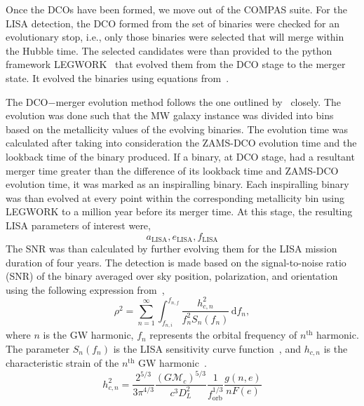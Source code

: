 \documentclass[journal, twocolumn]{IEEEtran}
\newcommand{\semaxis}[1]{a_{\text{#1}}}
\newcommand{\ecc}[1]{e_\text{#1}}
\begin{document}
    Once the DCOs have been formed, we move out of the COMPAS suite.
    For the LISA detection, the DCO formed from the set of binaries were checked for an evolutionary stop, i.e., only those binaries were selected that will merge within the Hubble time.
    The selected candidates were than provided to the python framework LEGWORK~\cite{wagg2021legwork} that evolved them from the DCO stage to the merger state.
    It evolved the binaries using equations from~\cite{Peters1963, Peters1964}.

    The DCO$-$merger evolution method follows the one outlined by~\cite{wagg2021gravitational} closely.
    The evolution was done such that the MW galaxy instance was divided into bins based on the metallicity values of the evolving binaries.
    The evolution time was calculated after taking into consideration the ZAMS-DCO evolution time and the lookback time of the binary produced.
    If a binary, at DCO stage, had a resultant merger time greater than the difference of its lookback time and ZAMS-DCO evolution time, it was marked as an inspiralling binary.
    Each inspiralling binary was than evolved at every point within the corresponding metallicity bin using LEGWORK to a million year before its merger time.
    At this stage, the resulting LISA parameters of interest were,
    \begin{equation}%
        \semaxis{LISA}, \ecc{LISA}, f_{\text{LISA}}
        \label{eq:lisa_parameter_names}
    \end{equation}%
    The SNR was than calculated by further evolving them for the LISA mission duration of four years. The detection is made based on the signal-to-noise ratio (SNR) of the binary averaged over sky position, polarization, and orientation using the following expression from~\cite{Finn2000},
    \begin{equation}
    \rho^2 = \sum_{n=1}^{\infty}\int_{f_{n, i}}^{f_{n, f}}\frac{h_{c, n}^2}{f_n^2 S_n(f_n)}\,\text{d}f_n,
    \label{eq:snr_equation}
    \end{equation}
    where $n$ is the GW harmonic, $f_n$ represents the orbital frequency of $n^\text{th}$ harmonic.
    The parameter $S_n(f_n)$ is the LISA sensitivity curve function~\cite{Robson2019}, and $h_{c, n}$ is the characteristic strain of the $n^\text{th}$ GW harmonic~\cite{Barack2004}.
    \begin{equation}
    h_{c,n}^2 = \frac{2^{5/3}}{3\pi^{4/3}}\frac{(G\mathcal{M}_c)^{5/3}}{c^3 D_L^2}\frac{1}{f_\text{orb}^{1/3}}\frac{g(n, e)}{nF(e)}
    \label{eq:characteristic_strain}
    \end{equation}
    
\end{document}
